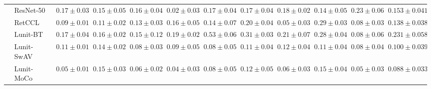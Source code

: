 \begin{tabular}{ll|cccc|c|cccc|c}
 & ResNet-50~\cite{he2015deep} & $0.17 \pm 0.03$ & $0.15 \pm 0.05$ & $0.16 \pm 0.04$ & $\mathbf{0.02 \pm 0.03}$ & $0.17 \pm 0.04$ & $0.17 \pm 0.04$ & $0.18 \pm 0.02$ & $0.14 \pm 0.05$ & $0.23 \pm 0.06$ & $0.153 \pm 0.041$ \\
 & RetCCL~\cite{wang2023retccl} & $0.09 \pm 0.01$ & $0.11 \pm 0.02$ & $0.13 \pm 0.03$ & $0.16 \pm 0.05$ & $0.14 \pm 0.07$ & $0.20 \pm 0.04$ & $0.05 \pm 0.03$ & $0.29 \pm 0.03$ & $0.08 \pm 0.03$ & $0.138 \pm 0.038$ \\
 & Lunit-BT~\cite{kang2023benchmarking} & $0.17 \pm 0.04$ & $0.16 \pm 0.02$ & $0.15 \pm 0.12$ & $0.19 \pm 0.02$ & $0.53 \pm 0.06$ & $0.31 \pm 0.03$ & $0.21 \pm 0.07$ & $0.28 \pm 0.04$ & $0.08 \pm 0.06$ & $0.231 \pm 0.058$ \\
 & Lunit-SwAV~\cite{kang2023benchmarking} & $0.11 \pm 0.01$ & $0.14 \pm 0.02$ & $0.08 \pm 0.03$ & $0.09 \pm 0.05$ & $0.08 \pm 0.05$ & $0.11 \pm 0.04$ & $0.12 \pm 0.04$ & $0.11 \pm 0.04$ & $0.08 \pm 0.04$ & $0.100 \pm 0.039$ \\
 & Lunit-MoCo~\cite{kang2023benchmarking} & $0.05 \pm 0.01$ & $0.15 \pm 0.03$ & $0.06 \pm 0.02$ & $0.04 \pm 0.03$ & $0.08 \pm 0.05$ & $0.12 \pm 0.05$ & $0.06 \pm 0.03$ & $0.15 \pm 0.04$ & $0.05 \pm 0.03$ & $0.088 \pm 0.033$ \\
\cline{1-12}
\bottomrule
\end{tabular}
